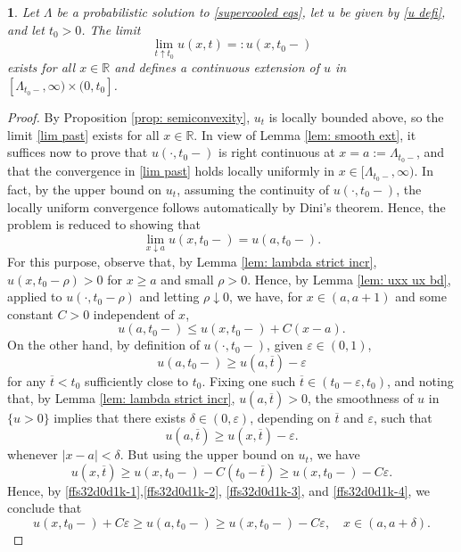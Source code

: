 \documentclass{article}
\numberwithin{equation}{section}
\numberwithin{figure}{section}
\theoremstyle{plain}
\theoremstyle{plain}
\theoremstyle{plain}
\theoremstyle{plain}
\newtheorem{lem}[thm]{\protect\lemmaname}
\theoremstyle{definition}
\theoremstyle{remark}
\def\vep{\varepsilon}
\def\ot{{\overline{t}}}
\def\R{{\mathbb{R}}}
\providecommand{\lemmaname}{Lemma}
\begin{document}
\begin{lem}\label{lem: lim past regu}  Let $\Lambda$ be a probabilistic solution to \eqref{supercooled eqs}, let $u$ be given by \eqref{u defi}, and let $t_0>0$. The limit
\begin{equation} \label{lim past}
  \lim_{t\uparrow t_0}u(x,t)=:u(x,t_0-)
\end{equation}
exists for all $x\in \R$ and defines a continuous extension of $u$ in $[\Lambda_{t_0-},\infty)\times (0,t_0]$.
\end{lem}
\begin{proof} By Proposition \ref{prop: semiconvexity}, $u_t$ is locally bounded above, so the limit \eqref{lim past} exists for all $x\in \R$. In view of Lemma \ref{lem: smooth ext}, it suffices now to prove that $u(\cdot,t_0-)$ is right continuous at $x=a:=\Lambda_{t_0-}$, and that the convergence in \eqref{lim past} holds locally uniformly in $x \in [\Lambda_{t_0-},\infty)$. In fact, by the upper bound on $u_t$, assuming the continuity of $u(\cdot,t_0-)$, the locally uniform convergence follows automatically by Dini's theorem. Hence, the problem is reduced to showing that \[\lim_{x\downarrow a}u(x,t_0-)=u(a,t_0-).\]
For this purpose, observe that, by Lemma \ref{lem: lambda strict incr}, $u(x,t_0-\rho)>0$ for $x\geq a$ and small $\rho>0$. Hence, by Lemma \ref{lem: uxx ux bd}, applied to $u(\cdot,t_0-\rho)$ and letting $\rho \downarrow 0$, we have, for $x\in (a,a+1)$ and some constant $C>0$ independent of $x$,
\begin{equation} \label{ffs32d0d1k-1}
    u(a,t_0-) \leq  u(x,t_0-)+C(x-a).
\end{equation}
On the other hand, by definition of $u(\cdot,t_0-)$, given $\vep\in (0,1)$, 
\begin{equation}\label{ffs32d0d1k-2}
    u(a,t_0-)\geq u(a,\ot)-\vep
\end{equation}
for any $\ot<t_0$ sufficiently close to $t_0$. Fixing one such $\ot \in(t_0-\vep,t_0)$, and noting that, by Lemma \ref{lem: lambda strict incr}, $u(a,\ot)>0$, the smoothness of $u$ in $\{u>0\}$ implies that there exists $\delta\in (0,\vep)$, depending on $\ot$ and $\vep$, such that
\begin{equation}\label{ffs32d0d1k-3}
    u(a,\ot)\geq u(x,\ot)-\vep. 
\end{equation}
whenever $|x-a|<\delta$. But using the upper bound on $u_t$, we have
\begin{equation}\label{ffs32d0d1k-4}
    u(x,\ot)\geq  u(x,t_0-)-C(t_0-\ot) \geq  u(x,t_0-) -C\vep.
\end{equation}
Hence, by \eqref{ffs32d0d1k-1},\eqref{ffs32d0d1k-2}, \eqref{ffs32d0d1k-3}, and \eqref{ffs32d0d1k-4}, we conclude that
\begin{equation}
    u(x,t_0-)+C\vep\geq u(a,t_0-) \geq u(x,t_0-)-C\vep, \quad x\in(a,a+\delta).
\end{equation}
\end{proof}
\end{document}
